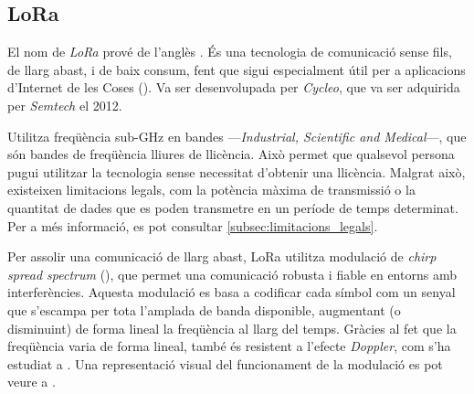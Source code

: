 \documentclass{tfgitic}[2024/07/01]
\begin{document}
\subsection{LoRa}
El nom de \emph{LoRa} prové de l'anglès . És una tecnologia de comunicació sense fils, de llarg abast, i de baix consum, fent que sigui especialment útil per a aplicacions d'Internet de les Coses (). Va ser desenvolupada per \emph{Cycleo}, que va ser adquirida per \emph{Semtech} el 2012.

Utilitza freqüència sub-GHz en bandes  ---\emph{Industrial, Scientific and Medical}---, que són bandes de freqüència lliures de llicència. Això permet que qualsevol persona pugui utilitzar la tecnologia sense necessitat d'obtenir una llicència. Malgrat això, existeixen limitacions legals, com la potència màxima de transmissió o la quantitat de dades que es poden transmetre en un període de temps determinat. Per a més informació, es pot consultar \ref{subsec:limitacions_legals}.

Per assolir una comunicació de llarg abast, LoRa utilitza modulació de \emph{chirp spread spectrum} (), que permet una comunicació robusta i fiable en entorns amb interferències. Aquesta modulació es basa a codificar cada símbol com un senyal que s'escampa per tota l'amplada de banda disponible, augmentant (o disminuint) de forma lineal la freqüència al llarg del temps. Gràcies al fet que la freqüència varia de forma lineal, també és resistent a l'efecte \emph{Doppler}, com s'ha estudiat a \cite{doroshkin_experimental_2019}. Una representació visual del funcionament de la modulació  es pot veure a \cite{richard_wenner_lora_2017}.
\end{document}
